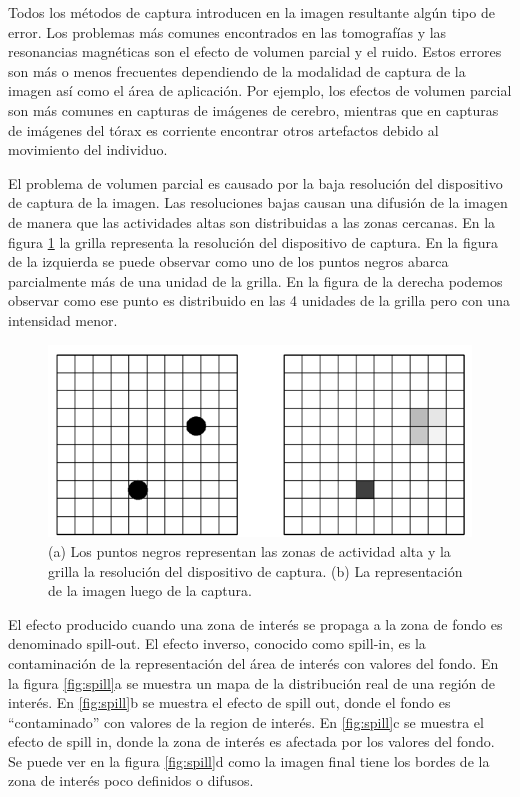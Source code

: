 Todos los métodos de captura introducen en la imagen resultante algún tipo de error. Los problemas más comunes encontrados en las tomografías y las resonancias magnéticas son el efecto de volumen parcial y el ruido. Estos errores son más o menos frecuentes dependiendo de la modalidad de captura de la imagen así como el área de aplicación. Por ejemplo, los efectos de volumen parcial son más comunes en capturas de imágenes de cerebro, mientras que en capturas de imágenes del tórax es corriente encontrar otros artefactos debido al movimiento del individuo.

El problema de volumen parcial es causado por la baja resolución del dispositivo de captura de la imagen. Las resoluciones bajas causan una difusión de la imagen de manera que las actividades altas son distribuidas a las zonas cercanas. En la figura \ref{fig:resolucion} la grilla representa la resolución del dispositivo de captura. En la figura de la izquierda se puede observar como uno de los puntos negros abarca parcialmente más de una unidad de la grilla. En la figura de la derecha podemos observar como ese punto es distribuido en las 4 unidades de la grilla pero con una intensidad menor.

\begin{figure}[h!]
\centering
\includegraphics[scale=0.3]{images/resolution.png}
\caption{(a) Los puntos negros representan las zonas de actividad alta y la grilla la resolución del dispositivo de captura. (b) La representación de la imagen luego de la captura.}
\label{fig:resolucion}
\end{figure}

El efecto producido cuando una zona de interés se propaga a la zona de fondo es denominado spill-out. El efecto inverso, conocido como spill-in, es la contaminación de la representación del área de interés con valores del fondo. En la figura \ref{fig:spill}a se muestra un mapa de la distribución real de una región de interés. En \ref{fig:spill}b se muestra el efecto de spill out, donde el fondo es “contaminado” con valores de la region de interés. En \ref{fig:spill}c se muestra el efecto de spill in, donde la zona de interés es afectada por los valores del fondo. Se puede ver en la figura \ref{fig:spill}d como la imagen final tiene los bordes de la zona de interés poco definidos o difusos.

